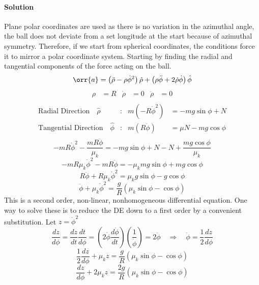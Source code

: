 \documentclass{article}
\begin{document}
{\begin{enumerate}
			\paragraph{Solution} Plane polar coordinates are used as there is no variation in the azimuthal angle, the ball does not deviate from a set longitude at the start because of azimuthal symmetry. Therefore, if we start from spherical coordinates, the conditions force it to mirror a polar coordinate system. Starting by finding the radial and tangential components of the force acting on the ball. \unboldmath  
			\[
				\orr{a} = \left( \ddot{\rho} - \rho \dot{\phi}^2 \right) \hat{\rho} + \left( \rho \ddot{\phi} + 2\dot{\rho} \dot{\phi} \right) \hat{\phi}
			\]
			\begin{equation*}
				\begin{aligned}
					\rho &= R & \dot{\rho} &= 0 & \ddot{\rho} &= 0 \\
				\end{aligned}
			\end{equation*}
			\begin{equation*}
				\begin{aligned}
					\text{Radial Direction} \quad \hat{\rho} &: & m\left( -R \dot{\phi}^2 \right) &= -mg\sin \phi + N \\
					\text{Tangential Direction} \quad \hat{\phi} &: & m\left( R \ddot{\phi} \right) &= \mu N - mg\cos \phi \\
				\end{aligned}
			\end{equation*}
			\[
				-mR \dot{\phi}^2 - \frac{mR \ddot{\phi}}{\mu_k} = -mg\sin \phi + N - N + \frac{mg\cos \phi}{\mu_k}
			\]
			\[
				-mR\mu_k \dot{\phi}^2 - mR \ddot{\phi} = -\mu_k mg\sin \phi + mg\cos \phi
			\]
			\[
				R\ddot{\phi} + R\mu_k \dot{\phi}^2 = \mu_k g\sin \phi - g\cos \phi
			\]
			\[
				\ddot{\phi} + \mu_k \dot{\phi}^2 = \frac{g}{R} \left( \mu_k \sin \phi - \cos \phi \right)
			\]
			This is a second order, non-linear, nonhomogeneous differential equation. One way to solve these is to reduce the DE down to a first order by a convenient substitution. Let $z = \dot{\phi}^2$
			\[
				\frac{dz}{d\phi} = \frac{dz}{dt} \frac{dt}{d\phi} = \left( 2\dot{\phi}\frac{d \dot{\phi}}{dt} \right) \left( \frac{1}{\dot{\phi}} \right) = 2\ddot{\phi} \quad \Rightarrow \quad \ddot{\phi} = \frac{1}{2} \frac{dz}{d\phi}
			\]
			\[
				\frac{1}{2} \frac{dz}{d\phi} + \mu_k z = \frac{g}{R} \left( \mu_k \sin \phi - \cos \phi \right)
			\]
			\[
				\frac{dz}{d\phi} + 2\mu_k z = \frac{2g}{R} \left( \mu_k \sin \phi - \cos \phi \right)
\]
\end{enumerate}}
\end{document}
